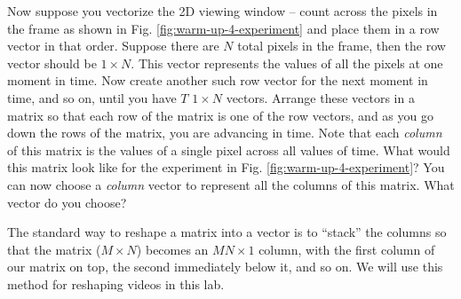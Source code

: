 Now suppose you vectorize the 2D viewing window -- count across the pixels in the frame as shown in Fig. \ref{fig:warm-up-4-experiment} and place them in a row vector in that order. Suppose there are $N$ total pixels in the frame, then the row vector should be $1 \times N$. This vector represents the values of all the pixels at one moment in time. Now create another such row vector for the next moment in time, and so on, until you have $T$ $1 \times N$ vectors. Arrange these vectors in a matrix so that each row of the matrix is one of the row vectors, and as you go down the rows of the matrix, you are advancing in time. Note that each \textit{column} of this matrix is the values of a single pixel across all values of time. What would this matrix look like for the experiment in Fig. \ref{fig:warm-up-4-experiment}? You can now choose a \textit{column} vector to represent all the columns of this matrix. What vector do you choose?

The standard way to reshape a matrix into a vector is to ``stack'' the columns so that the matrix ($M \times N$) becomes an $MN \times 1$ column, with the first column of our matrix on top, the second immediately below it, and so on. We will use this method for reshaping videos in this lab.